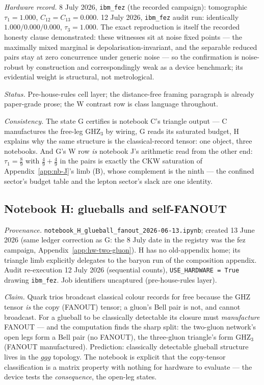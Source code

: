 \emph{Hardware record.} 8 July 2026, \texttt{ibm\_fez} (the recorded campaign): tomographic
$\tau_{1} = 1.000$, $C_{12} = C_{13} = 0.000$. 12 July 2026, \texttt{ibm\_fez} audit run:
identically $1.000 / 0.000 / 0.000$, $\tau_{3} = 1.000$. The exact reproduction is itself the
recorded honesty clause demonstrated: these witnesses sit at noise fixed points --- the
maximally mixed marginal is depolarisation-invariant, and the separable reduced pairs stay at
zero concurrence under generic noise --- so the confirmation is noise-robust by construction and
correspondingly weak as a device benchmark; its evidential weight is structural, not metrological.

\emph{Status.} Pre-house-rules cell layer; the distance-free framing paragraph is already
paper-grade prose; the W contrast row is class language throughout.

\emph{Consistency.} The state G certifies is notebook C's triangle output --- C manufactures the
free-leg GHZ$_{3}$ by wiring, G reads its saturated budget, H explains why the same structure is
the classical-record tensor: one object, three notebooks. And G's W row \emph{is} notebook J's
arithmetic read from the other end: $\tau_{1} = \tfrac89$ with $\tfrac49 + \tfrac49$ in the pairs
is exactly the CKW saturation of Appendix~\ref{app:nb-J}'s limb (B), whose complement is the
ninth --- the confined sector's budget table and the lepton sector's slack are one identity.

\subsection{Notebook H: glueballs and self-FANOUT}
\label{app:nb-H}

\emph{Provenance.} \texttt{notebook\_H\_glueball\_fanout\_2026-06-13.ipynb}; created 13 June
2026 (same ledger correction as G: the 8 July date in the registry was the fez campaign,
Appendix~\ref{app:hw-two-gluon}). H has no old-appendix home; its triangle limb explicitly
delegates to the baryon run of the composition appendix. Audit re-execution 12 July 2026
(sequential counts), \texttt{USE\_HARDWARE = True} drawing \texttt{ibm\_fez}. Job identifiers
uncaptured (pre-house-rules layer).

\emph{Claim.} Quark trios broadcast classical colour records for free because the GHZ tensor
\emph{is} the copy (FANOUT) tensor; a gluon's Bell pair is not, and cannot broadcast. For a
glueball to be classically detectable its closure must \emph{manufacture} FANOUT --- and the
computation finds the sharp split: the two-gluon network's open legs form a Bell pair (no
FANOUT), the three-gluon triangle's form GHZ$_{3}$ (FANOUT manufactured). Prediction: classically
detectable glueball structure lives in the $ggg$ topology. The notebook is explicit that the
copy-tensor classification is a matrix property with nothing for hardware to evaluate --- the
device tests the \emph{consequence}, the open-leg states.

